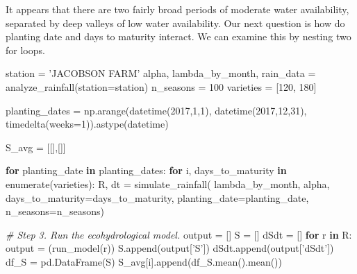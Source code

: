 \documentclass[11pt]{article}
\newenvironment{Shaded}{}{}
\newcommand{\KeywordTok}[1]{\textcolor[rgb]{0.00,0.44,0.13}{\textbf{{#1}}}}
\newcommand{\DecValTok}[1]{\textcolor[rgb]{0.25,0.63,0.44}{{#1}}}
\newcommand{\StringTok}[1]{\textcolor[rgb]{0.25,0.44,0.63}{{#1}}}
\newcommand{\CommentTok}[1]{\textcolor[rgb]{0.38,0.63,0.69}{\textit{{#1}}}}
\newcommand{\NormalTok}[1]{{#1}}
\newcommand{\ControlFlowTok}[1]{\textcolor[rgb]{0.00,0.44,0.13}{\textbf{{#1}}}}
\newcommand{\OperatorTok}[1]{\textcolor[rgb]{0.40,0.40,0.40}{{#1}}}
\newcommand{\BuiltInTok}[1]{{#1}}
\begin{document}
    It appears that there are two fairly broad periods of moderate water
availability, separated by deep valleys of low water availability. Our
next question is how do planting date and days to maturity interact. We
can examine this by nesting two for loops.

\begin{Shaded}
\begin{Highlighting}[]
\NormalTok{station }\OperatorTok{=} \StringTok{'JACOBSON FARM'}
\NormalTok{alpha, lambda_by_month, rain_data }\OperatorTok{=}\NormalTok{ analyze_rainfall(station}\OperatorTok{=}\NormalTok{station)}
\NormalTok{n_seasons }\OperatorTok{=} \DecValTok{100}
\NormalTok{varieties }\OperatorTok{=}\NormalTok{ [}\DecValTok{120}\NormalTok{, }\DecValTok{180}\NormalTok{]}

\NormalTok{planting_dates }\OperatorTok{=}\NormalTok{ np.arange(datetime(}\DecValTok{2017}\NormalTok{,}\DecValTok{1}\NormalTok{,}\DecValTok{1}\NormalTok{), datetime(}\DecValTok{2017}\NormalTok{,}\DecValTok{12}\NormalTok{,}\DecValTok{31}\NormalTok{), timedelta(weeks}\OperatorTok{=}\DecValTok{1}\NormalTok{)).astype(datetime)}

\NormalTok{S_avg }\OperatorTok{=}\NormalTok{ [[],[]]}

\ControlFlowTok{for}\NormalTok{ planting_date }\KeywordTok{in}\NormalTok{ planting_dates:}
    \ControlFlowTok{for}\NormalTok{ i, days_to_maturity }\KeywordTok{in} \BuiltInTok{enumerate}\NormalTok{(varieties): }
\NormalTok{        R, dt }\OperatorTok{=}\NormalTok{ simulate_rainfall(}
\NormalTok{            lambda_by_month, alpha,}
\NormalTok{            days_to_maturity}\OperatorTok{=}\NormalTok{days_to_maturity,}
\NormalTok{            planting_date}\OperatorTok{=}\NormalTok{planting_date, n_seasons}\OperatorTok{=}\NormalTok{n_seasons)}

        \CommentTok{# Step 3. Run the ecohydrological model.}
\NormalTok{        output }\OperatorTok{=}\NormalTok{ []}
\NormalTok{        S }\OperatorTok{=}\NormalTok{ []}
\NormalTok{        dSdt }\OperatorTok{=}\NormalTok{ []}
        \ControlFlowTok{for}\NormalTok{ r }\KeywordTok{in}\NormalTok{ R:}
\NormalTok{            output }\OperatorTok{=}\NormalTok{ (run_model(r))}
\NormalTok{            S.append(output[}\StringTok{'S'}\NormalTok{])}
\NormalTok{            dSdt.append(output[}\StringTok{'dSdt'}\NormalTok{])}
\NormalTok{        df_S }\OperatorTok{=}\NormalTok{ pd.DataFrame(S)}
\NormalTok{        S_avg[i].append(df_S.mean().mean())}
\end{Highlighting}
\end{Shaded}
\end{document}
